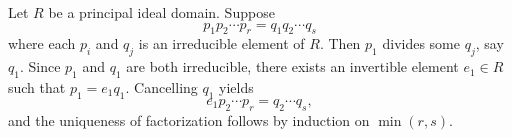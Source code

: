 Let $R$ be a principal ideal domain. Suppose
$$p_1 p_2 \cdots p_r = q_1 q_2 \cdots q_s$$
where each $p_i$ and $q_j$ is an irreducible element of $R$. Then $p_1$ divides some $q_j$, say $q_1$. Since $p_1$ and $q_1$ are both irreducible, there exists an invertible element $e_1 \in R$ such that $p_1 = e_1 q_1$. Cancelling $q_1$ yields
$$e_1 p_2 \cdots p_r = q_2 \cdots q_s,$$
and the uniqueness of factorization follows by induction on $\min(r, s)$.
